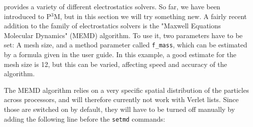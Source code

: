 \documentclass[
a4paper,                        %
11pt,                           %
twoside,                        %
footsepline,                    %
headsepline,                    %
headexclude,                    %
footexclude,                    %
pagesize,                       %
]{scrartcl}
\begin{document}

\iffalse
\es{} provides a variety of different electrostatics solvers. So far,
we have been introduced to P$^3$M, but in this section we will try
something new. A fairly recent addition to the family of electrostatics
solvers is the "Maxwell Equations Molecular Dynamics" (MEMD) algorithm.
To use it, two parameters have to be set: A mesh size, and a method
parameter called \verb|f_mass|, which can be estimated by a formula
given in the \es{} user guide. In this example, a good estimate for
the mesh size is 12, but this can be varied, affecting speed and
accuracy of the algorithm.

The MEMD algorithm relies on a very specific spatial distribution of
the particles across processors, and will therefore currently not work
with Verlet lists. Since those are switched on by default, they will
have to be turned off manually by adding the following line before the
\verb|setmd| commands:
\end{document}
